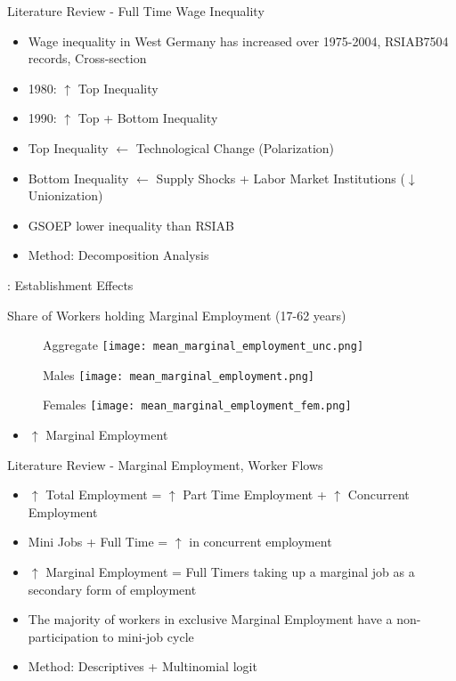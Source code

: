 \documentclass[hyperref={bookmarks=false}]{beamer}
\let\oldcite=\cite
\renewcommand{\cite}[1]{\textcolor[rgb]{.0,.2,.7}{\oldcite{#1}}}
\begin{document}
\begin{frame}{Literature Review - Full Time Wage Inequality}
\cite{DuLuSc09}
\begin{itemize}
\setlength{\itemsep}{0.5 cm}
\item Wage inequality in West Germany has increased over
1975-2004, RSIAB7504 records, Cross-section
\item 1980: $\uparrow$ Top Inequality
\item 1990: $\uparrow$ Top + Bottom Inequality
\item Top Inequality $\leftarrow$ Technological Change (Polarization)
\item Bottom Inequality $\leftarrow$ Supply Shocks + Labor Market Institutions ($\downarrow$ Unionization)
\item GSOEP lower inequality than RSIAB
\item Method: Decomposition Analysis
\end{itemize}
\cite{CaHeKl13}: Establishment Effects
\end{frame}


\begin{frame}{Share of Workers holding Marginal Employment (17-62 years) }
\begin{figure}[!t]
\centering
\begin{minipage}[b]{0.32\textwidth}{Aggregate}
\centering
\texttt{[image: mean\_marginal\_employment\_unc.png]}
\end{minipage}
\begin{minipage}[b]{0.32\textwidth}{Males}
\centering
\texttt{[image: mean\_marginal\_employment.png]}
\end{minipage}
\begin{minipage}[b]{0.32\textwidth}{Females}
\centering
\texttt{[image: mean\_marginal\_employment\_fem.png]}
\end{minipage}
\end{figure}
\begin{itemize}
\setlength{\itemsep}{0.7 cm}
\item $\uparrow$ Marginal Employment
\end{itemize}
\cite{Galasi16}
\end{frame}

\begin{frame}{Literature Review - Marginal Employment, Worker Flows}
\cite{CarriTuRo15}
\begin{itemize}
\setlength{\itemsep}{0.5 cm}
\item $\uparrow$ Total Employment = $\uparrow$ Part Time Employment + $\uparrow$ Concurrent Employment 
\item Mini Jobs + Full Time = $\uparrow$ in concurrent employment
\item $\uparrow$ Marginal Employment = Full Timers taking up a marginal job as a secondary form of employment
\item The majority of workers in exclusive Marginal Employment have a non-participation to mini-job cycle
\item Method: Descriptives + Multinomial logit
\end{itemize}
\end{frame}
\end{document}
